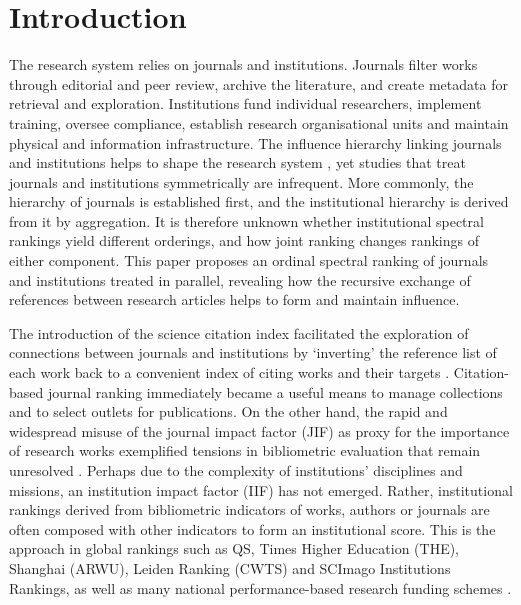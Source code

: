 \section{Introduction}
\label{sec:introduction}

The research system relies on journals and institutions. Journals filter
works through editorial and peer review, archive the literature, and
create metadata for retrieval and exploration. Institutions fund individual researchers,
implement training, oversee compliance, establish research organisational units
and maintain physical and information infrastructure. The influence hierarchy linking journals and institutions helps to shape the research system \citep{mertonSociologyScienceTheoretical1973, mcnameeStratificationScienceComparison1994, martinTiedKnowledgePower1998}, yet studies that treat journals and institutions symmetrically are infrequent. More commonly, the hierarchy of journals is established first, and the institutional hierarchy is derived from it by aggregation. It is therefore unknown whether institutional spectral rankings yield different orderings, and how joint ranking changes rankings of either component. This paper proposes an ordinal spectral ranking of journals and institutions treated in parallel, revealing how the recursive exchange of references between research articles helps to form and maintain influence. 

The introduction of the science citation index \citep{garfieldScienceCitationIndex1964} facilitated the exploration of connections between journals and institutions by `inverting' the reference list of each work back to a convenient index of citing works and their targets \citep{wouters}. Citation-based journal ranking immediately became a useful means to manage collections and to select outlets for publications. On the other hand, the rapid and widespread misuse of the journal impact factor (JIF) as proxy for the importance of research works exemplified tensions in bibliometric evaluation that remain unresolved \citep{garfieldCitationAnalysisLegitimate1979,bornmannCitationCountsResearch2008, leydesdorffCitationsIndicatorsQuality2016, macrobertsMismeasureScienceCitation2018}. Perhaps due to the complexity of institutions' disciplines and missions, an institution impact factor (IIF) has not emerged. Rather, institutional rankings derived from bibliometric indicators of works, authors or journals are often composed with other indicators to form an institutional score. This is the approach in global rankings such as QS, Times Higher Education (THE), Shanghai (ARWU), Leiden Ranking (CWTS) and SCImago Institutions Rankings, as well as many national performance-based research funding schemes \citep{zacharewiczPerformancebasedResearchFunding2019}. 

